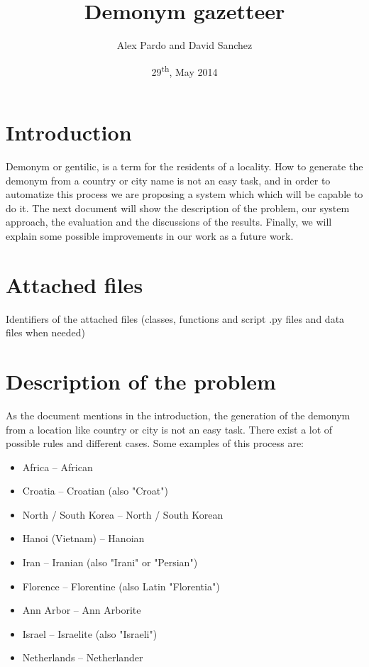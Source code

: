 \documentclass[]{report}
\title{Demonym gazetteer}
\date{29\textsuperscript{th}, May 2014}
\author{Alex Pardo and David Sanchez}
\begin{document}
\maketitle

\tableofcontents

\newpage

\section{Introduction}

Demonym or gentilic, is a term for the residents of a locality. 
How to generate the demonym from a country or city name is not an easy task, and in order to automatize this process we are proposing a system which which will be capable to do it. 
The next document will show the description of the problem, our system approach, the evaluation and the discussions of the results. Finally, we will explain some possible improvements in our work as a future work.

\section{Attached files}

Identifiers of the attached files (classes, functions and script .py files and
data files when needed)

\section{Description of the problem}

As the document mentions in the introduction, the generation of the demonym from a location like country or city is not an easy task. There exist a lot of possible rules and different cases. 
\vspace{0.5cm}
Some examples of this process are:
\begin{itemize}
\item Africa -- African
\item Croatia -- Croatian (also "Croat")
\item North / South Korea -- North / South Korean
\item Hanoi (Vietnam) -- Hanoian
\item Iran -- Iranian (also "Irani" or "Persian")
\item Florence -- Florentine (also Latin "Florentia")
\item Ann Arbor -- Ann Arborite
\item Israel -- Israelite (also "Israeli")
\item Netherlands -- Netherlander
\end{itemize}
\end{document}
